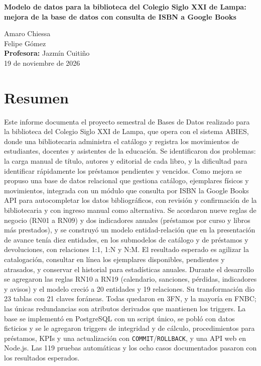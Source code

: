 \documentclass[11pt,a4paper]{article}
\begin{document}
\begin{center}
{\LARGE\bfseries Modelo de datos para la biblioteca del Colegio Siglo XXI de Lampa: mejora de la base de datos con consulta de ISBN a Google Books\par}
\vspace{1em}

Amaro Chiessa \\
Felipe Gómez \\[0.5em]
\textbf{Profesora:} Jazmín Cuitiño\\[0.5em]
19 de noviembre de 2026
\end{center}

\vspace{1em}

\section*{Resumen}
Este informe documenta el proyecto semestral de Bases de Datos realizado para la biblioteca del Colegio Siglo XXI de Lampa, que opera con el sistema ABIES, donde una bibliotecaria administra el catálogo y registra los movimientos de estudiantes, docentes y asistentes de la educación. Se identificaron dos problemas: la carga manual de título, autores y editorial de cada libro, y la dificultad para identificar rápidamente los préstamos pendientes y vencidos. Como mejora se propuso una base de datos relacional que gestiona catálogo, ejemplares físicos y movimientos, integrada con un módulo que consulta por ISBN la Google Books API para autocompletar los datos bibliográficos, con revisión y confirmación de la bibliotecaria y con ingreso manual como alternativa. Se acordaron nueve reglas de negocio (RN01 a RN09) y dos indicadores anuales (préstamos por curso y libros más prestados), y se construyó un modelo entidad-relación que en la presentación de avance tenía diez entidades, en los submodelos de catálogo y de préstamos y devoluciones, con relaciones 1:1, 1:N y N:M. El resultado esperado es agilizar la catalogación, consultar en línea los ejemplares disponibles, pendientes y atrasados, y conservar el historial para estadísticas anuales. Durante el desarrollo se agregaron las reglas RN10 a RN19 (calendario, sanciones, pérdidas, indicadores y avisos) y el modelo creció a 20 entidades y 19 relaciones. Su transformación dio 23 tablas con 21 claves foráneas. Todas quedaron en 3FN, y la mayoría en FNBC; las únicas redundancias son atributos derivados que mantienen los triggers. La base se implementó en PostgreSQL con un script único, se pobló con datos ficticios y se le agregaron triggers de integridad y de cálculo, procedimientos para préstamos, KPIs y una actualización con \texttt{COMMIT}/\texttt{ROLLBACK}, y una API web en Node.js. Las 119 pruebas automáticas y los ocho casos documentados pasaron con los resultados esperados.
\end{document}
